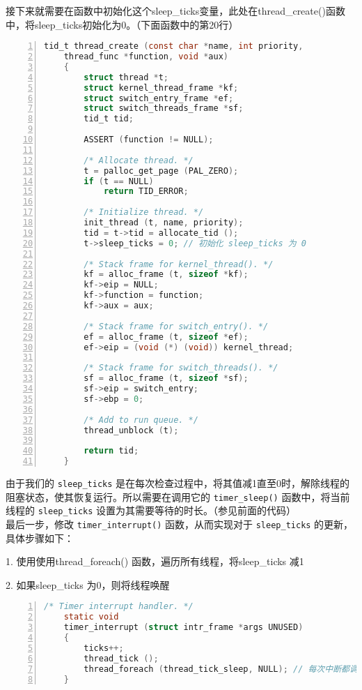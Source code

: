 \documentclass{article}
\begin{document}
	接下来就需要在函数中初始化这个sleep\_ticks变量，此处在thread\_create()函数中，将sleep\_ticks初始化为0。（下面函数中的第20行）
	
	\begin{lstlisting}[xleftmargin = 4em,xrightmargin = 4em, aboveskip = 1em, numbers = left, language = C, title=修改后的\texttt{thread\_create()}函数]
    tid_t thread_create (const char *name, int priority,
    thread_func *function, void *aux) 
    {
    	struct thread *t;
    	struct kernel_thread_frame *kf;
    	struct switch_entry_frame *ef;
    	struct switch_threads_frame *sf;
    	tid_t tid;
    	
    	ASSERT (function != NULL);
    	
    	/* Allocate thread. */
    	t = palloc_get_page (PAL_ZERO);
    	if (t == NULL)
    	    return TID_ERROR;
    	
    	/* Initialize thread. */
    	init_thread (t, name, priority);
    	tid = t->tid = allocate_tid ();
    	t->sleep_ticks = 0; // 初始化 sleep_ticks 为 0
    	
    	/* Stack frame for kernel_thread(). */
    	kf = alloc_frame (t, sizeof *kf);
    	kf->eip = NULL;
    	kf->function = function;
    	kf->aux = aux;
    	
    	/* Stack frame for switch_entry(). */
    	ef = alloc_frame (t, sizeof *ef);
    	ef->eip = (void (*) (void)) kernel_thread;
    	
    	/* Stack frame for switch_threads(). */
    	sf = alloc_frame (t, sizeof *sf);
    	sf->eip = switch_entry;
    	sf->ebp = 0;
    	
    	/* Add to run queue. */
    	thread_unblock (t);
    	
    	return tid;
    }
	\end{lstlisting}
	
	由于我们的 \texttt{sleep\_ticks} 是在每次检查过程中，将其值减1直至0时，解除线程的阻塞状态，使其恢复运行。所以需要在调用它的 \texttt{timer\_sleep()} 函数中，将当前线程的 \texttt{sleep\_ticks} 设置为其需要等待的时长。（参见前面的代码）\\[1em]
	
	最后一步，修改 \texttt{timer\_interrupt()} 函数，从而实现对于 \texttt{sleep\_ticks} 的更新，具体步骤如下：
	
	1. 使用使用thread\_foreach() 函数，遍历所有线程，将sleep\_ticks 减1
	
	2. 如果sleep\_ticks 为0，则将线程唤醒
	
	\begin{lstlisting}[xleftmargin = 4em,xrightmargin = 4em, aboveskip = 1em, numbers = left, language = C, title=修改后的\texttt{timer\_interrupt()}函数]
    /* Timer interrupt handler. */
    static void
    timer_interrupt (struct intr_frame *args UNUSED)
    {
    	ticks++;
    	thread_tick ();
    	thread_foreach (thread_tick_sleep, NULL); // 每次中断都调用 
    }
	\end{lstlisting}
	
\end{document}

